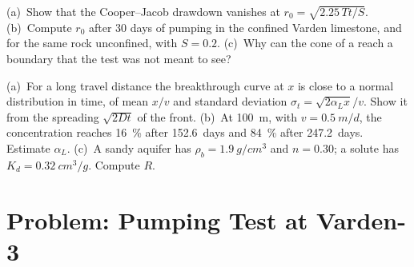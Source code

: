 \begin{exercise}[$\star\star\star$]\label{exo:b3:hydrogeology:11}
(a)~Show that the Cooper--Jacob drawdown vanishes at $r_0 =
\sqrt{2.25\,Tt/S}$. (b)~Compute $r_0$ after 30 days of pumping in the
confined Varden limestone, and for the same rock unconfined, with $S =
0.2$. (c)~Why can the cone of a  reach a boundary that the
test was not meant to see?
\end{exercise}

\begin{exercise}[$\star\star\star$]\label{exo:b3:hydrogeology:12}
(a)~For a long travel distance the breakthrough curve at $x$ is close to a
normal distribution in time, of mean $x/v$ and standard deviation $\sigma_t
= \sqrt{2\alpha_Lx}/v$. Show it from the spreading $\sqrt{2Dt}$ of the front.
(b)~At \qty{100}{m}, with $v = \qty{0.5}{m/d}$, the concentration reaches
\qty{16}{\percent} after \num{152.6}~days and \qty{84}{\percent} after
\num{247.2}~days. Estimate $\alpha_L$. (c)~A sandy aquifer has $\rho_b =
\qty{1.9}{g/cm^3}$ and $n = 0.30$; a solute has $K_d =
\qty{0.32}{cm^3/g}$. Compute $R$.
\end{exercise}

\section{Problem: Pumping Test at Varden-3}

